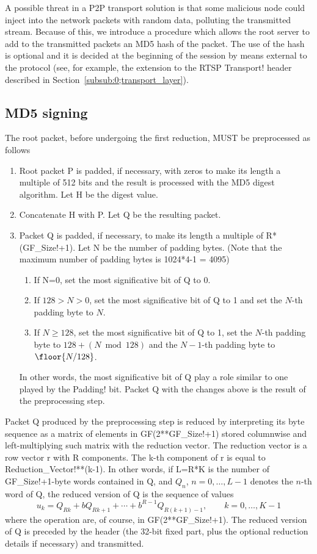 \documentclass{rfc}
\begin{document}
A possible threat in a P2P transport solution is that some malicious
node could inject into the network packets with random data, polluting
the transmitted stream. Because of this, we introduce a procedure
which allows the root server to add to the transmitted packets an MD5
hash of the packet.  The use of the hash is optional and it is decided
at the beginning of the session by means external to the protocol
(see, for example, the extension to the RTSP \ttt Transport! header
described in Section~\ref{subsub:0;transport_layer}).


\subsection{MD5 signing}
\label{subsub:5.1.0;transport_layer}

The root packet, before undergoing the first reduction, MUST be
preprocessed as follows

\begin{enumerate}
\item
Root packet P is padded, if necessary, with zeros to make its length a
multiple of 512 bits and the result is processed with the MD5 digest
algorithm.  Let H be the digest value.
\item
Concatenate H with P.  Let Q be the resulting packet.
\item
Packet Q is padded, if necessary, to make its length a multiple of
R*(\ttt GF_Size!+1).  Let N be the number of padding bytes.  (Note
that the maximum number of padding bytes is 1024*4-1 = 4095)
\begin{enumerate}
  \item 
    If N=0, set the most significative bit of Q to 0.
  \item 
    If $128 > N > 0$, set the most significative bit of Q to 1 and set the
    $N$-th padding byte to $N$.
  \item
    If $N \geq 128$,  set the most significative bit of Q to 1, set the
    $N$-th padding byte to $128 + (N \bmod 128)$ and the $N-1$-th
    padding byte to $\floor{N / 128}$.
\end{enumerate}
In other words, the most significative bit of Q play a role similar to
one played by the \ttt Padding! bit.  Packet Q with the changes above
is the result of the preprocessing step.
\end{enumerate}
%
Packet Q produced by the preprocessing step is reduced by interpreting
its byte sequence as a matrix of elements in GF(2**\ttt GF_Size!+1)
stored columnwise and left-multiplying such matrix with the reduction
vector.  The reduction vector is a row vector r with R components. The
k-th component of r is equal to \ttt Reduction_Vector!**(k-1).  In
other words, if L=R*K is the number of \ttt GF_Size!+1-byte words
contained in Q, and $Q_n$, $n=0, \ldots, L-1$ denotes the $n$-th word
of Q, the reduced version of Q is the sequence of values
$$
u_k = Q_{Rk} + b Q_{Rk+1} +  \cdots
+ b^{R-1} Q_{R(k+1)-1},
\qquad k=0, \ldots, K-1
$$ 
%
where the operation are, of course, in GF(2**\ttt GF_Size!+1).  The
reduced version of Q is preceded by the header (the 32-bit fixed part,
plus the optional reduction details if necessary) and transmitted.
\end{document}
